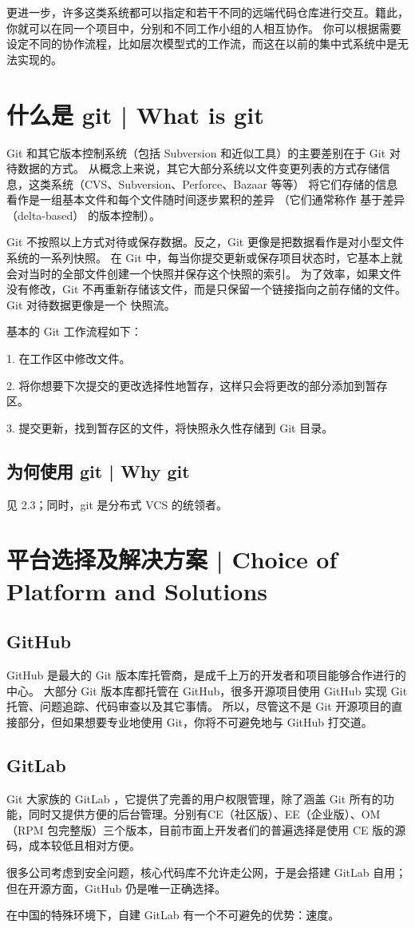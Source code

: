 \documentclass{nle}
\begin{document}
更进一步，许多这类系统都可以指定和若干不同的远端代码仓库进行交互。籍此，你就可以在同一个项目中，分别和不同工作小组的人相互协作。 你可以根据需要设定不同的协作流程，比如层次模型式的工作流，而这在以前的集中式系统中是无法实现的。

\section{什么是 git | What is git}

Git 和其它版本控制系统（包括 Subversion 和近似工具）的主要差别在于 Git 对待数据的方式。 从概念上来说，其它大部分系统以文件变更列表的方式存储信息，这类系统（CVS、Subversion、Perforce、Bazaar 等等） 将它们存储的信息看作是一组基本文件和每个文件随时间逐步累积的差异 （它们通常称作 基于差异（delta-based） 的版本控制）。

Git 不按照以上方式对待或保存数据。反之，Git 更像是把数据看作是对小型文件系统的一系列快照。 在 Git 中，每当你提交更新或保存项目状态时，它基本上就会对当时的全部文件创建一个快照并保存这个快照的索引。 为了效率，如果文件没有修改，Git 不再重新存储该文件，而是只保留一个链接指向之前存储的文件。 Git 对待数据更像是一个 快照流。

基本的 Git 工作流程如下：

1. 在工作区中修改文件。

2. 将你想要下次提交的更改选择性地暂存，这样只会将更改的部分添加到暂存区。

3. 提交更新，找到暂存区的文件，将快照永久性存储到 Git 目录。

\subsection{为何使用 git | Why git}

见 2.3；同时，git 是分布式 VCS 的统领者。

\section{平台选择及解决方案 | Choice of Platform and Solutions}

\subsection{GitHub}

GitHub 是最大的 Git 版本库托管商，是成千上万的开发者和项目能够合作进行的中心。 大部分 Git 版本库都托管在 GitHub，很多开源项目使用 GitHub 实现 Git 托管、问题追踪、代码审查以及其它事情。 所以，尽管这不是 Git 开源项目的直接部分，但如果想要专业地使用 Git，你将不可避免地与 GitHub 打交道。

\subsection{GitLab}

Git 大家族的 GitLab ，它提供了完善的用户权限管理，除了涵盖 Git 所有的功能，同时又提供方便的后台管理。分别有CE（社区版）、EE（企业版）、OM（RPM 包完整版）三个版本，目前市面上开发者们的普遍选择是使用 CE 版的源码，成本较低且相对方便。

很多公司考虑到安全问题，核心代码库不允许走公网，于是会搭建 GitLab 自用；但在开源方面，GitHub 仍是唯一正确选择。

在中国的特殊环境下，自建 GitLab 有一个不可避免的优势：速度。

\label{lastpage}
\end{document}
